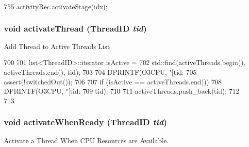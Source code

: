 \begin{DoxyCode}
755     { activityRec.activateStage(idx); }
\end{DoxyCode}
\hypertarget{classFullO3CPU_a687aa4600423bb30ecf3bb1da6cd6000}{
\subsubsection[{activateThread}]{\setlength{\rightskip}{0pt plus 5cm}void activateThread ({\bf ThreadID} {\em tid})}}
\label{classFullO3CPU_a687aa4600423bb30ecf3bb1da6cd6000}
Add Thread to Active Threads List 


\begin{DoxyCode}
700 {
701     list<ThreadID>::iterator isActive =
702         std::find(activeThreads.begin(), activeThreads.end(), tid);
703 
704     DPRINTF(O3CPU, "[tid:%
705     assert(!switchedOut());
706 
707     if (isActive == activeThreads.end()) {
708         DPRINTF(O3CPU, "[tid:%
709                 tid);
710 
711         activeThreads.push_back(tid);
712     }
713 }
\end{DoxyCode}
\hypertarget{classFullO3CPU_a47befc2af24481200005f0b9cffab093}{
\subsubsection[{activateWhenReady}]{\setlength{\rightskip}{0pt plus 5cm}void activateWhenReady ({\bf ThreadID} {\em tid})}}
\label{classFullO3CPU_a47befc2af24481200005f0b9cffab093}
Activate a Thread When CPU Resources are Available. 


